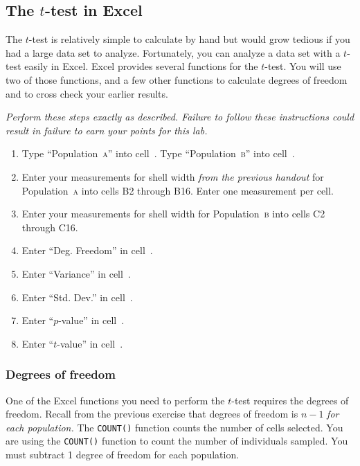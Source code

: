 \documentclass[12pt]{exam}
\newcommand*\Popa{Population~\textsc{a}}
\newcommand*\Popb{Population~\textsc{b}}
\newcommand*\xcell[1]{cell~\liningnum{#1}}
\begin{document}
\subsection*{The $t$-test in Excel}

The $t$-test is relatively simple to calculate by hand but would grow tedious if you had a large data set to analyze. Fortunately, you can analyze a data set with a $t$-test easily in Excel. Excel provides several functions for the $t$-test. You will use two of those functions, and a few other functions to calculate degrees of freedom and to cross check your earlier results.

\emph{Perform these steps exactly as described. Failure to follow these instructions could result in failure to earn your points for this lab.} 

\begin{enumerate}
	\item Type “\Popa” into \xcell{B1}. Type “\Popb” into \xcell{C1}.

	\item Enter your measurements for shell width \emph{from the previous handout} for \Popa{} into cells {\liningnum B2 through B16}. Enter one measurement per cell.
	
	\item Enter your measurements for shell width for \Popb{} into cells {\liningnum C2 through C16}.
	
	\item Enter “Deg. Freedom” in \xcell{A18}.

	\item Enter “Variance” in \xcell{A19}.
	
	\item Enter “Std. Dev.” in \xcell{A20}.

	\item Enter “$p$-value” in \xcell{A21}.
	
	\item Enter “$t$-value” in \xcell{A22}.
	 
\end{enumerate}

\subsubsection*{Degrees of freedom}

One of the Excel functions you need to perform the $t$-test requires the degrees of freedom. Recall from the previous exercise that degrees of freedom is $n-1$ \emph{for each population.} The \texttt{COUNT()} function counts the number of cells selected. You are using the \texttt{COUNT()} function to count the number of individuals sampled. You must subtract 1 degree of freedom for each population.
\end{document}
